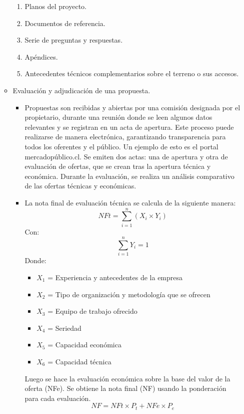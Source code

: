 \documentclass{article} %
\begin{document}
\begin{enumerate}
\begin{itemize}
\begin{enumerate}
            \item Planos del proyecto.
            \item Documentos de referencia.
            \item Serie de preguntas y respuestas.
            \item Apéndices.
            \item Antecedentes técnicos complementarios sobre el terreno o sus accesos.
        \end{enumerate}
        \item Evaluación y adjudicación de una propuesta.
        \begin{itemize}
            \item Propuestas son recibidas y abiertas por una comisión designada por el propietario, durante una reunión donde se leen algunos datos relevantes y se registran en un acta de apertura. Este proceso puede realizarse de manera electrónica, garantizando transparencia para todos los oferentes y el público. Un ejemplo de esto es el portal mercadopúblico.cl. Se emiten dos actas: una de apertura y otra de evaluación de ofertas, que se crean tras la apertura técnica y económica. Durante la evaluación, se realiza un análisis comparativo de las ofertas técnicas y económicas.
            \item La nota final de evaluación técnica se calcula de la siguiente manera:
            \begin{equation}
                NFt = \sum_{i=1}^{n} (X_i \times Y_i)
            \end{equation}
            Con:
            \begin{equation}
                \sum_{i=1}^{n} Y_i = 1 
            \end{equation}
            Donde:
            \begin{itemize}
                \item $X_1$ = Experiencia y antecedentes de la empresa
                \item $X_2$ = Tipo de organización y metodología que se ofrecen
                \item $X_3$ = Equipo de trabajo ofrecido
                \item $X_4$ = Seriedad
                \item $X_5$ = Capacidad económica
                \item $X_6$ = Capacidad técnica
            \end{itemize}
            Luego se hace la evaluación económica sobre la base del valor de la oferta (NFe).
            Se obtiene la nota final (NF) usando la ponderación para cada evaluación.
            \begin{equation}
                NF = NFt \times P_t + NFe \times P_e
            \end{equation}
        \end{itemize}
    \end{itemize}
\end{enumerate}
\end{document}
